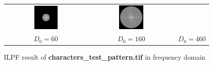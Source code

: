 \documentclass[11pt,a4paper]{article}
\begin{document}
\begin{figure}[!htbp]
\begin{tabular}{ccc}
		\includegraphics[width=0.3\textwidth]{pro3/ILPF/ILPF_160_spectrum}&
		\includegraphics[width=0.3\textwidth]{pro3/ILPF/ILPF_460_spectrum} \\
		 $D_0=60$ &  $D_0=160$ &  $D_0=460$
	\end{tabular}
	\caption{ILPF result of \textbf{characters\_test\_pattern.tif} in frequency domain}
	\label{pro3_fig2}
\end{figure}
\end{document}

